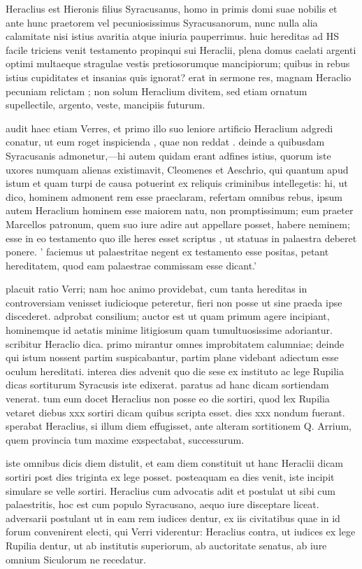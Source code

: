  Heraclius est Hieronis filius Syracusanus, homo in primis domi suae nobilis et ante hunc praetorem vel pecuniosissimus Syracusanorum, nunc nulla alia calamitate nisi istius avaritia atque iniuria pauperrimus. huic hereditas ad HS facile triciens venit testamento propinqui sui Heraclii, plena domus caelati argenti optimi multaeque stragulae vestis pretiosorumque mancipiorum; quibus in rebus istius cupiditates et insanias quis ignorat? erat in sermone res, magnam Heraclio pecuniam relictam ; non solum Heraclium divitem, sed etiam ornatum supellectile, argento, veste, mancipiis futurum.

 audit haec etiam Verres, et primo illo suo leniore artificio Heraclium adgredi conatur, ut eum roget inspicienda , quae non reddat . deinde a quibusdam Syracusanis admonetur,—hi autem quidam erant adfines istius, quorum iste uxores numquam alienas existimavit, Cleomenes et Aeschrio, qui quantum apud istum et quam turpi de causa potuerint ex reliquis criminibus intellegetis: hi, ut dico, hominem admonent rem esse praeclaram, refertam omnibus rebus, ipsum autem Heraclium hominem esse maiorem natu, non promptissimum; eum praeter Marcellos patronum, quem suo iure adire aut appellare posset, habere neminem; esse in eo testamento quo ille heres esset scriptus , ut statuas in palaestra deberet ponere. ' faciemus ut palaestritae negent ex testamento esse positas, petant hereditatem, quod eam palaestrae commissam esse dicant.'

 placuit ratio Verri; nam hoc animo providebat, cum tanta hereditas in controversiam venisset iudicioque peteretur, fieri non posse ut sine praeda ipse discederet. adprobat consilium; auctor est ut quam primum agere incipiant, hominemque id aetatis minime litigiosum quam tumultuosissime adoriantur. scribitur Heraclio dica. primo mirantur omnes improbitatem calumniae; deinde qui istum nossent partim suspicabantur, partim plane videbant adiectum esse oculum hereditati. interea dies advenit quo die sese ex instituto ac lege Rupilia dicas sortiturum Syracusis iste edixerat. paratus ad hanc dicam sortiendam venerat. tum eum docet Heraclius non posse eo die sortiri, quod lex Rupilia vetaret diebus xxx sortiri dicam quibus scripta esset. dies xxx nondum fuerant. sperabat Heraclius, si illum diem effugisset, ante alteram sortitionem Q. Arrium, quem provincia tum maxime exspectabat, successurum.

 iste omnibus dicis diem distulit, et eam diem constituit ut hanc Heraclii dicam sortiri post dies triginta ex lege posset. posteaquam ea dies venit, iste incipit simulare se velle sortiri. Heraclius cum advocatis adit et postulat ut sibi cum palaestritis, hoc est cum populo Syracusano, aequo iure disceptare liceat. adversarii postulant ut in eam rem iudices dentur, ex iis civitatibus quae in id forum convenirent electi, qui Verri viderentur: Heraclius contra, ut iudices ex lege Rupilia dentur, ut ab institutis superiorum, ab auctoritate senatus, ab iure omnium Siculorum ne recedatur.

